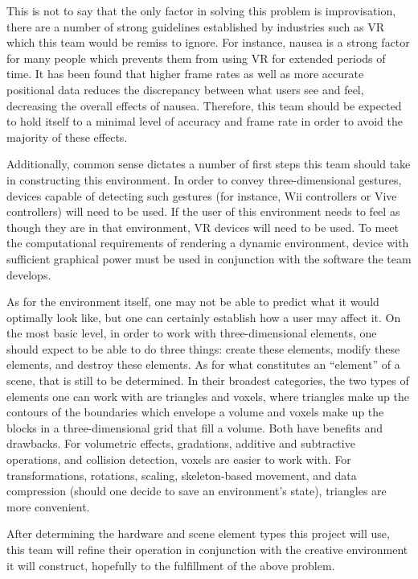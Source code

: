 \documentclass[letterpaper,10pt,titlepage]{article}
\begin{document}
This is not to say that the only factor in solving this problem is improvisation, there are a number of strong guidelines established by industries such as VR which this team would be remiss to ignore. For instance, nausea is a strong factor for many people which prevents them from using VR for extended periods of time. It has been found that higher frame rates as well as more accurate positional data reduces the discrepancy between what users see and feel, decreasing the overall effects of nausea. Therefore, this team should be expected to hold itself to a minimal level of accuracy and frame rate in order to avoid the majority of these effects.

Additionally, common sense dictates a number of first steps this team should take in constructing this environment. In order to convey three-dimensional gestures, devices capable of detecting such gestures (for instance, Wii controllers or Vive controllers) will need to be used. If the user of this environment needs to feel as though they are in that environment, VR devices will need to be used. To meet the computational requirements of rendering a dynamic environment, device with sufficient graphical power must be used in conjunction with the software the team develops.

As for the environment itself, one may not be able to predict what it would optimally look like, but one can certainly establish how a user may affect it. On the most basic level, in order to work with three-dimensional elements, one should expect to be able to do three things: create these elements, modify these elements, and destroy these elements. As for what constitutes an “element” of a scene, that is still to be determined. In their broadest categories, the two types of elements one can work with are triangles and voxels, where triangles make up the contours of the boundaries which envelope a volume and voxels make up the blocks in a three-dimensional grid that fill a volume. Both have benefits and drawbacks. For volumetric effects, gradations, additive and subtractive operations, and collision detection, voxels are easier to work with. For transformations, rotations, scaling, skeleton-based movement, and data compression (should one decide to save an environment’s state), triangles are more convenient.

After determining the hardware and scene element types this project will use, this team will refine their operation in conjunction with the creative environment it will construct, hopefully to the fulfillment of the above problem.
\end{document}

